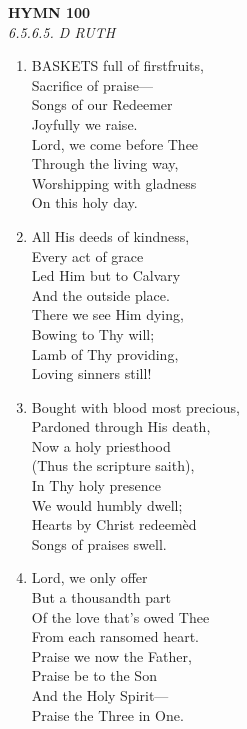 \newpage
\begin{center}
    {\Large \textbf{HYMN 100\textdagger{}}}
    \\
    \textit{6.5.6.5. D RUTH}
\end{center}
\vspace{1em}

\begin{enumerate}
    \item BASKETS full of firstfruits, \\
        Sacrifice of praise--- \\
        Songs of our Redeemer \\
        Joyfully we raise. \\
        Lord, we come before Thee \\
        Through the living way, \\
        Worshipping with gladness \\
        On this holy day.

    \item All His deeds of kindness, \\
        Every act of grace \\
        Led Him but to Calvary \\
        And the outside place. \\
        There we see Him dying, \\
        Bowing to Thy will; \\
        Lamb of Thy providing, \\
        Loving sinners still!

    \item Bought with blood most precious, \\
        Pardoned through His death, \\
        Now a holy priesthood \\
        (Thus the scripture saith), \\
        In Thy holy presence \\
        We would humbly dwell; \\
        Hearts by Christ redeem\`ed \\
        Songs of praises swell.

    \item Lord, we only offer \\
        But a thousandth part \\
        Of the love that's owed Thee \\
        From each ransomed heart. \\
        Praise we now the Father, \\
        Praise be to the Son \\
        And the Holy Spirit--- \\
        Praise the Three in One.

\end{enumerate}

